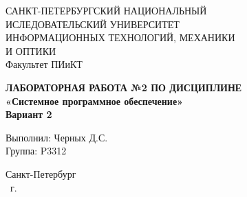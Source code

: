\documentclass[14pt,a4paper,report]{ncc}
\begin{document}
\renewcommand{\thesection}{\arabic{section}}

\renewcommand{\chaptername}{}
\def\contentsname{Содержание}

\begin{titlepage}
\begin{center}
\large{САНКТ-ПЕТЕРБУРГСКИЙ НАЦИОНАЛЬНЫЙ\\
ИСЛЕДОВАТЕЛЬСКИЙ УНИВЕРСИТЕТ\\
ИНФОРМАЦИОННЫХ ТЕХНОЛОГИЙ, МЕХАНИКИ\\
И ОПТИКИ\\[5mm]
Факультет ПИиКТ\\[2mm]}

\vfill

\textbf{ЛАБОРАТОРНАЯ РАБОТА №2 ПО ДИСЦИПЛИНЕ\\[3mm]
«Системное программное обеспечение»\\[6mm]
Вариант 2
\\[20mm]
}
\end{center}

\hfill
\begin{minipage}{.5\textwidth}
Выполнил: Черных Д.С.\\
Группа: P3312\\[5mm]
\end{minipage}%
\vfill
\begin{center}
 Санкт-Петербург\\\theyear\ г.
\end{center}
\end{titlepage}
\thispagestyle{empty}
\tableofcontents
\thispagestyle{empty}
\newpage










\end{document}

